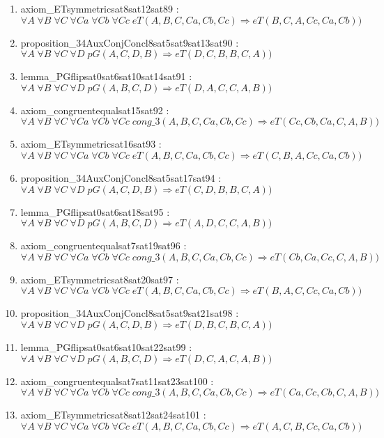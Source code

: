 \documentclass{article}
\begin{document}
\begin{enumerate}
\item axiom\_ETsymmetricsat8sat12sat89 : $\forall A\;\forall B\;\forall C\;\forall Ca\;\forall Cb\;\forall Cc\;eT(A, B, C, Ca, Cb, Cc) \Rightarrow eT(B, C, A, Cc, Ca, Cb))$
\item proposition\_34AuxConjConcl8sat5sat9sat13sat90 : $\forall A\;\forall B\;\forall C\;\forall D\;pG(A, C, D, B) \Rightarrow eT(D, C, B, B, C, A))$
\item lemma\_PGflipsat0sat6sat10sat14sat91 : $\forall A\;\forall B\;\forall C\;\forall D\;pG(A, B, C, D) \Rightarrow eT(D, A, C, C, A, B))$
\item axiom\_congruentequalsat15sat92 : $\forall A\;\forall B\;\forall C\;\forall Ca\;\forall Cb\;\forall Cc\;cong\_3(A, B, C, Ca, Cb, Cc) \Rightarrow eT(Cc, Cb, Ca, C, A, B))$
\item axiom\_ETsymmetricsat16sat93 : $\forall A\;\forall B\;\forall C\;\forall Ca\;\forall Cb\;\forall Cc\;eT(A, B, C, Ca, Cb, Cc) \Rightarrow eT(C, B, A, Cc, Ca, Cb))$
\item proposition\_34AuxConjConcl8sat5sat17sat94 : $\forall A\;\forall B\;\forall C\;\forall D\;pG(A, C, D, B) \Rightarrow eT(C, D, B, B, C, A))$
\item lemma\_PGflipsat0sat6sat18sat95 : $\forall A\;\forall B\;\forall C\;\forall D\;pG(A, B, C, D) \Rightarrow eT(A, D, C, C, A, B))$
\item axiom\_congruentequalsat7sat19sat96 : $\forall A\;\forall B\;\forall C\;\forall Ca\;\forall Cb\;\forall Cc\;cong\_3(A, B, C, Ca, Cb, Cc) \Rightarrow eT(Cb, Ca, Cc, C, A, B))$
\item axiom\_ETsymmetricsat8sat20sat97 : $\forall A\;\forall B\;\forall C\;\forall Ca\;\forall Cb\;\forall Cc\;eT(A, B, C, Ca, Cb, Cc) \Rightarrow eT(B, A, C, Cc, Ca, Cb))$
\item proposition\_34AuxConjConcl8sat5sat9sat21sat98 : $\forall A\;\forall B\;\forall C\;\forall D\;pG(A, C, D, B) \Rightarrow eT(D, B, C, B, C, A))$
\item lemma\_PGflipsat0sat6sat10sat22sat99 : $\forall A\;\forall B\;\forall C\;\forall D\;pG(A, B, C, D) \Rightarrow eT(D, C, A, C, A, B))$
\item axiom\_congruentequalsat7sat11sat23sat100 : $\forall A\;\forall B\;\forall C\;\forall Ca\;\forall Cb\;\forall Cc\;cong\_3(A, B, C, Ca, Cb, Cc) \Rightarrow eT(Ca, Cc, Cb, C, A, B))$
\item axiom\_ETsymmetricsat8sat12sat24sat101 : $\forall A\;\forall B\;\forall C\;\forall Ca\;\forall Cb\;\forall Cc\;eT(A, B, C, Ca, Cb, Cc) \Rightarrow eT(A, C, B, Cc, Ca, Cb))$

\end{enumerate}
\end{document}
